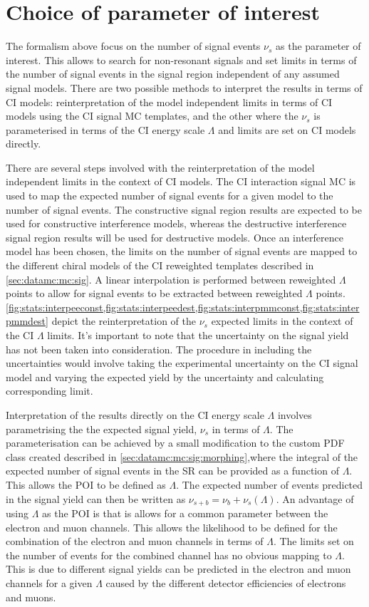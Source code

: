 \section{Choice of parameter of interest}\label{sec:stat:poi}
The formalism above focus on the number of signal events $\nu_s$ as the parameter of interest. This allows to search for non-resonant signals and set limits in terms of the number of signal events in the signal region independent of any assumed signal models. There are two possible methods to interpret the results in terms of CI models: reinterpretation of the model independent limits in terms of CI models using the CI signal MC templates, and the other where the $\nu_s$ is parameterised in terms of the CI energy scale $\Lambda$ and limits are set on CI models directly. 

There are several steps involved with the reinterpretation of the model independent limits in the context of CI models. The CI interaction signal MC is used to map the expected number of signal events for a given model to the number of signal events. The constructive signal region results are expected to be used for constructive interference models, whereas the destructive interference signal region results will be used for destructive models. Once an interference model has been chosen, the limits on the number of signal events are mapped to the different chiral models of the CI reweighted templates described in \cref{sec:datamc:mc:sig}. A linear interpolation is performed between reweighted $\Lambda$ points to allow for signal events to be extracted between reweighted $\Lambda$ points. \cref{fig:stats:interpeeconst,fig:stats:interpeedest,fig:stats:interpmmconst,fig:stats:interpmmdest} depict the reinterpretation of the $\nu_s$ expected limits in the context of the CI $\Lambda$ limits. It's important to note that the uncertainty on the signal yield has not been taken into consideration. The procedure in including the uncertainties would involve taking the experimental uncertainty on the CI signal model and varying the expected yield by the uncertainty and calculating corresponding limit. 

Interpretation of the results directly on the CI energy scale $\Lambda$ involves parametrising the the expected signal yield, $\nu_s$ in terms of $\Lambda$. The parameterisation can be achieved by a small modification to the custom PDF class created described in \cref{sec:datamc:mc:sig:morphing},where the integral of the expected number of signal events in the SR can be provided as a function of $\Lambda$. This allows the POI to be defined as $\Lambda$. The expected number of events predicted in the signal yield can then be written as $\nu_{s+b} = \nu_b +\nu_s(\Lambda)$. An advantage of using $\Lambda$ as the POI is that is allows for a common parameter between the electron and muon channels. This allows the likelihood to be defined for the combination of the electron and muon channels in terms of $\Lambda$. The limits set on the number of events for the combined channel has no obvious mapping to $\Lambda$. This is due to different signal yields can be predicted in the electron and muon channels for a given $\Lambda$ caused by the different detector efficiencies of electrons and muons. 

